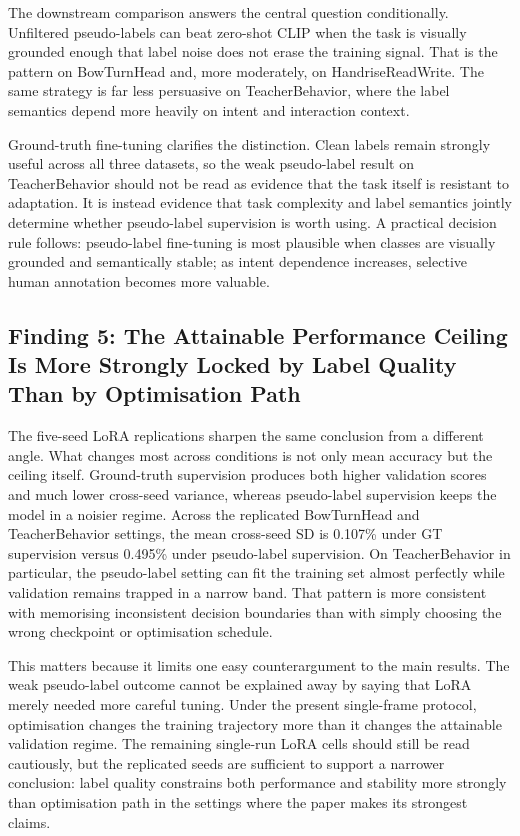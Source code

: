 \documentclass[10pt,letterpaper]{article}
\begin{document}
The downstream comparison answers the central question
conditionally.
Unfiltered pseudo-labels can beat zero-shot CLIP when the task is
visually grounded enough that label noise does not erase the training
signal.
That is the pattern on BowTurnHead and, more moderately, on
HandriseReadWrite.
The same strategy is far less persuasive on TeacherBehavior, where the
label semantics depend more heavily on intent and interaction context.

Ground-truth fine-tuning clarifies the distinction.
Clean labels remain strongly useful across all three datasets, so the
weak pseudo-label result on TeacherBehavior should not be read as
evidence that the task itself is resistant to adaptation.
It is instead evidence that task complexity and label semantics jointly
determine whether pseudo-label supervision is worth using.
A practical decision rule follows: pseudo-label fine-tuning is most
plausible when classes are visually grounded and semantically stable;
as intent dependence increases, selective human annotation becomes more
valuable.

\subsection*{Finding 5: The Attainable Performance Ceiling Is More
Strongly Locked by Label Quality Than by Optimisation Path}

The five-seed LoRA replications sharpen the same conclusion from a
different angle.
What changes most across conditions is not only mean accuracy but the
ceiling itself.
Ground-truth supervision produces both higher validation scores and
much lower cross-seed variance, whereas pseudo-label supervision keeps
the model in a noisier regime.
Across the replicated BowTurnHead and TeacherBehavior settings, the
mean cross-seed SD is 0.107\% under GT supervision versus 0.495\%
under pseudo-label supervision.
On TeacherBehavior in particular, the pseudo-label setting can fit the
training set almost perfectly while validation remains trapped in a
narrow band.
That pattern is more consistent with memorising inconsistent decision
boundaries than with simply choosing the wrong checkpoint or
optimisation schedule.

This matters because it limits one easy counterargument to the main
results.
The weak pseudo-label outcome cannot be explained away by saying that
LoRA merely needed more careful tuning.
Under the present single-frame protocol, optimisation changes the
training trajectory more than it changes the attainable validation
regime.
The remaining single-run LoRA cells should still be read cautiously,
but the replicated seeds are sufficient to support a narrower
conclusion: label quality constrains both performance and stability
more strongly than optimisation path in the settings where the paper
makes its strongest claims.
\end{document}
